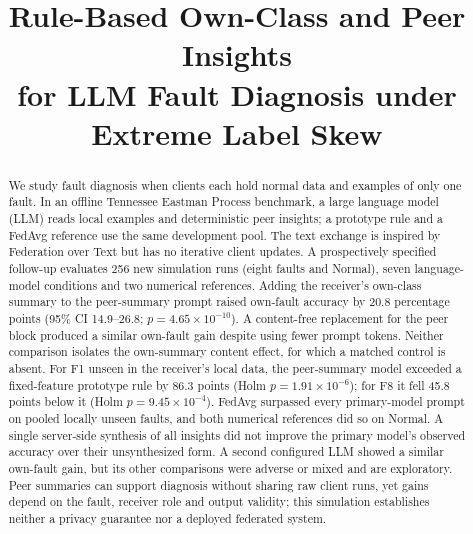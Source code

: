 \documentclass[conference]{IEEEtran}
\begin{document}
\title{Rule-Based Own-Class and Peer Insights\\
for LLM Fault Diagnosis under Extreme Label Skew}

\author{%
}

\maketitle

\begin{abstract}
We study fault diagnosis when clients each hold normal data and examples of only one fault. In an offline Tennessee Eastman Process benchmark, a large language model (LLM) reads local examples and deterministic peer insights; a prototype rule and a FedAvg reference use the same development pool. The text exchange is inspired by Federation over Text but has no iterative client updates. A prospectively specified follow-up evaluates 256 new simulation runs (eight faults and Normal), seven language-model conditions and two numerical references. Adding the receiver's own-class summary to the peer-summary prompt raised own-fault accuracy by 20.8 percentage points (95\% CI 14.9--26.8; $p=4.65\times10^{-10}$). A content-free replacement for the peer block produced a similar own-fault gain despite using fewer prompt tokens. Neither comparison isolates the own-summary content effect, for which a matched control is absent. For F1 unseen in the receiver's local data, the peer-summary model exceeded a fixed-feature prototype rule by 86.3 points (Holm $p=1.91\times10^{-6}$); for F8 it fell 45.8 points below it (Holm $p=9.45\times10^{-4}$). FedAvg surpassed every primary-model prompt on pooled locally unseen faults, and both numerical references did so on Normal. A single server-side synthesis of all insights did not improve the primary model's observed accuracy over their unsynthesized form. A second configured LLM showed a similar own-fault gain, but its other comparisons were adverse or mixed and are exploratory. Peer summaries can support diagnosis without sharing raw client runs, yet gains depend on the fault, receiver role and output validity; this simulation establishes neither a privacy guarantee nor a deployed federated system.


\end{abstract}
\end{document}
